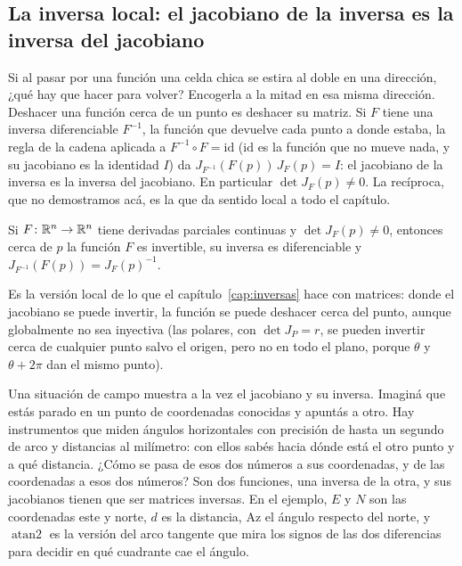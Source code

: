 \subsection{La inversa local: el jacobiano de la inversa es la inversa del jacobiano}\label{sec:inversa-local}

Si al pasar por una función una celda chica se estira al doble en una dirección, ¿qué hay que
hacer para volver? Encogerla a la mitad en esa misma dirección. Deshacer una función cerca de un
punto es deshacer su matriz. Si \(F\) tiene una inversa diferenciable \(F^{-1}\), la función
que devuelve cada punto a donde estaba, la regla de la cadena aplicada a
\(F^{-1}\circ F=\mathrm{id}\) (\(\mathrm{id}\) es la función que no mueve nada, y su jacobiano
es la identidad \(I\)) da \(J_{F^{-1}}(F(p))\,J_F(p)=I\): el jacobiano de la inversa
es la inversa del jacobiano. En particular \(\det J_F(p)\neq0\). La recíproca, que no
demostramos acá, es la que da sentido local a todo el capítulo.

\begin{resultado}
Si \(F\colon\mathbb{R}^n\to\mathbb{R}^n\) tiene derivadas parciales continuas y \(\det J_F(p)\neq0\), entonces
cerca de \(p\) la función \(F\) es invertible, su inversa es diferenciable y
\(J_{F^{-1}}(F(p))=J_F(p)^{-1}\).
\end{resultado}

Es la versión local de lo que el capítulo~\ref{cap:inversas} hace con matrices: donde el
jacobiano se puede invertir, la función se puede deshacer cerca del punto, aunque globalmente
no sea inyectiva (las polares, con \(\det J_P=r\), se pueden invertir cerca de cualquier punto
salvo el origen, pero no en todo el plano, porque \(\theta\) y \(\theta+2\pi\) dan el mismo
punto).

Una situación de campo muestra a la vez el jacobiano y su inversa. Imaginá que estás parado en
un punto de coordenadas conocidas y apuntás a otro. Hay instrumentos que miden ángulos
horizontales con precisión de hasta un segundo de arco y distancias al milímetro: con ellos
sabés hacia dónde está el otro punto y a qué distancia. ¿Cómo se pasa de esos dos números a sus
coordenadas, y de las coordenadas a esos dos números? Son dos funciones, una inversa de la otra,
y sus jacobianos tienen que ser matrices inversas. En el ejemplo, \(E\) y \(N\) son las
coordenadas este y norte, \(d\) es la distancia, \(\mathrm{Az}\) el ángulo respecto del norte, y
\(\operatorname{atan2}\) es la versión del arco tangente que mira los signos de las dos
diferencias para decidir en qué cuadrante cae el ángulo.

